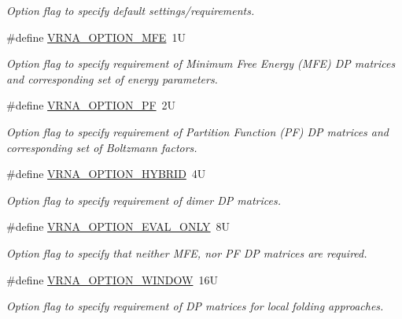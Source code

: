 \begin{DoxyCompactItemize}
\begin{DoxyCompactList}\small\item\em Option flag to specify default settings/requirements. \end{DoxyCompactList}\item 
\#define \hyperlink{group__fold__compound_gae63be9127fe7dcc1f9bb14f5bb1064ee}{V\+R\+N\+A\+\_\+\+O\+P\+T\+I\+O\+N\+\_\+\+M\+FE}~1U
\begin{DoxyCompactList}\small\item\em Option flag to specify requirement of Minimum Free Energy (M\+FE) DP matrices and corresponding set of energy parameters. \end{DoxyCompactList}\item 
\#define \hyperlink{group__fold__compound_gabfbadcddda3e74ce7f49035ef8f058f7}{V\+R\+N\+A\+\_\+\+O\+P\+T\+I\+O\+N\+\_\+\+PF}~2U
\begin{DoxyCompactList}\small\item\em Option flag to specify requirement of Partition Function (PF) DP matrices and corresponding set of Boltzmann factors. \end{DoxyCompactList}\item 
\#define \hyperlink{group__fold__compound_ga8f681fa12b8d4b348bf58415fd1fc82f}{V\+R\+N\+A\+\_\+\+O\+P\+T\+I\+O\+N\+\_\+\+H\+Y\+B\+R\+ID}~4U\hypertarget{group__fold__compound_ga8f681fa12b8d4b348bf58415fd1fc82f}{}\label{group__fold__compound_ga8f681fa12b8d4b348bf58415fd1fc82f}

\begin{DoxyCompactList}\small\item\em Option flag to specify requirement of dimer DP matrices. \end{DoxyCompactList}\item 
\#define \hyperlink{group__fold__compound_ga61469c423131552c8483229f8b6c7e0e}{V\+R\+N\+A\+\_\+\+O\+P\+T\+I\+O\+N\+\_\+\+E\+V\+A\+L\+\_\+\+O\+N\+LY}~8U
\begin{DoxyCompactList}\small\item\em Option flag to specify that neither M\+FE, nor PF DP matrices are required. \end{DoxyCompactList}\item 
\#define \hyperlink{group__fold__compound_ga2b2a8009ccdccc3eb1571556261aee8e}{V\+R\+N\+A\+\_\+\+O\+P\+T\+I\+O\+N\+\_\+\+W\+I\+N\+D\+OW}~16U\hypertarget{group__fold__compound_ga2b2a8009ccdccc3eb1571556261aee8e}{}\label{group__fold__compound_ga2b2a8009ccdccc3eb1571556261aee8e}

\begin{DoxyCompactList}\small\item\em Option flag to specify requirement of DP matrices for local folding approaches. \end{DoxyCompactList}\end{DoxyCompactItemize}
